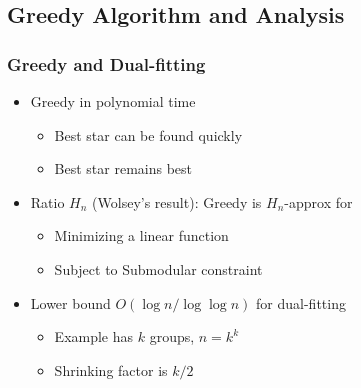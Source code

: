 \documentclass[hyperref,dvipsnames,svgnames,compress]{beamer}
\begin{document}
\subsection[Dual-fitting]{Greedy Algorithm and Analysis}
\begin{frame}
  \frametitle{Greedy and Dual-fitting}
  \begin{itemize}
  \item Greedy in polynomial time
    \begin{itemize}
    \item Best star can be found quickly
    \item Best star remains best
    \end{itemize}
  \item Ratio $H_n$ (Wolsey's result):
    Greedy is $H_n$-approx for
    \begin{itemize}
    \item Minimizing a linear function
    \item Subject to Submodular constraint
    \end{itemize}
  \item Lower bound $O(\log n / \log\log n)$ for dual-fitting
    \begin{itemize}
    \item Example has $k$ groups, $n = k^k$
    \item Shrinking factor is $k/2$
    \end{itemize}
  \end{itemize}
\end{frame}
\end{document}
